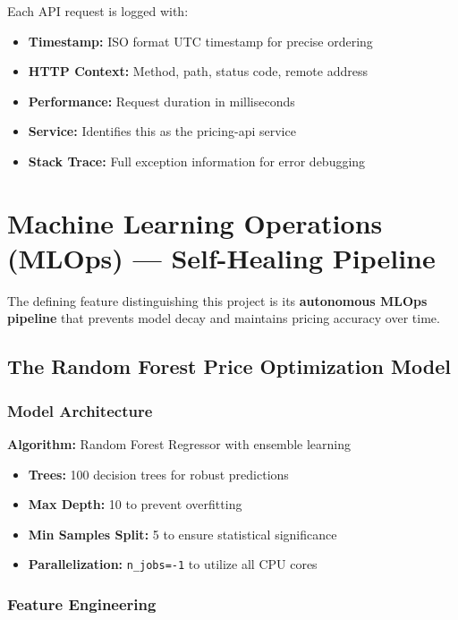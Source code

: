 \documentclass[12pt,a4paper]{report}
\begin{document}
Each API request is logged with:
\begin{itemize}[leftmargin=2em]
    \item \textbf{Timestamp:} ISO format UTC timestamp for precise ordering
    \item \textbf{HTTP Context:} Method, path, status code, remote address
    \item \textbf{Performance:} Request duration in milliseconds
    \item \textbf{Service:} Identifies this as the pricing-api service
    \item \textbf{Stack Trace:} Full exception information for error debugging
\end{itemize}

\chapter{Machine Learning Operations (MLOps) --- Self-Healing Pipeline}

The defining feature distinguishing this project is its \textbf{autonomous MLOps pipeline} that prevents model decay and maintains pricing accuracy over time.

\section{The Random Forest Price Optimization Model}

\subsection{Model Architecture}

\textbf{Algorithm:} Random Forest Regressor with ensemble learning
\begin{itemize}[leftmargin=2em]
    \item \textbf{Trees:} 100 decision trees for robust predictions
    \item \textbf{Max Depth:} 10 to prevent overfitting
    \item \textbf{Min Samples Split:} 5 to ensure statistical significance
    \item \textbf{Parallelization:} \texttt{n\_jobs=-1} to utilize all CPU cores
\end{itemize}

\subsection{Feature Engineering}
\end{document}
